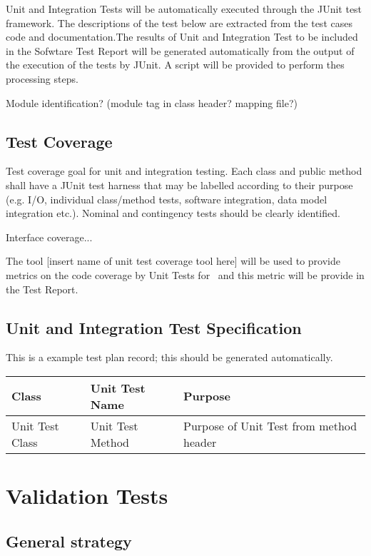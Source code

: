 Unit and Integration Tests will be automatically executed through the JUnit test framework. The descriptions of the test below are extracted from the test cases code and documentation.The results of Unit and Integration Test to be included in the Sofwtare Test Report will be generated automatically from the output of the execution of the tests by JUnit. A script will be provided to perform thes processing steps.

Module identification? (module tag in class header? mapping file?)

\subsection{Test Coverage}

Test coverage goal for unit and integration testing. Each class and public method shall have a JUnit test harness that may be labelled according to their purpose (e.g. I/O, individual class/method tests, software integration, data model integration etc.). Nominal and contingency
tests should be clearly identified.

Interface coverage...

The tool [insert name of unit test coverage tool here] will be used to provide metrics on the code coverage by Unit Tests for \product \ and this metric will be provide in the Test Report.

\subsection{Unit and Integration Test Specification}

This is a example test plan record; this should be generated automatically.

\begin{longtable} {|p{}|p{}|p{}|}\hline
{\bf Class} & {\bf Unit Test Name} & {\bf Purpose}  \\\hline
Unit Test Class & 
Unit Test Method & 
Purpose of Unit Test from method header \\\hline
\end{longtable}

\section{Validation Tests}

\subsection{General strategy}

